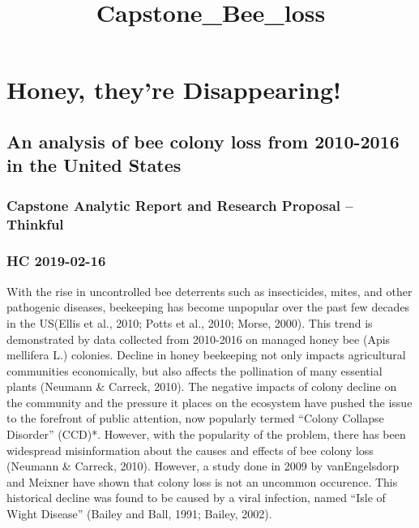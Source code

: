 \documentclass[11pt]{article}
\title{Capstone\_Bee\_loss}
\begin{document}
    
    
    \maketitle
    
    

    
    \hypertarget{honey-theyre-disappearing}{%
\section{Honey, they're Disappearing!}\label{honey-theyre-disappearing}}

\hypertarget{an-analysis-of-bee-colony-loss-from-2010-2016-in-the-united-states}{%
\subsection{An analysis of bee colony loss from 2010-2016 in the United
States}\label{an-analysis-of-bee-colony-loss-from-2010-2016-in-the-united-states}}

\hypertarget{capstone-analytic-report-and-research-proposal-thinkful}{%
\subsubsection{Capstone Analytic Report and Research Proposal --
Thinkful}\label{capstone-analytic-report-and-research-proposal-thinkful}}

\hypertarget{hc-2019-02-16}{%
\subsubsection{HC 2019-02-16}\label{hc-2019-02-16}}

    With the rise in uncontrolled bee deterrents such as insecticides,
mites, and other pathogenic diseases, beekeeping has become unpopular
over the past few decades in the US(Ellis et al., 2010; Potts et al.,
2010; Morse, 2000). This trend is demonstrated by data collected from
2010-2016 on managed honey bee (Apis mellifera L.) colonies. Decline in
honey beekeeping not only impacts agricultural communities economically,
but also affects the pollination of many essential plants (Neumann \&
Carreck, 2010). The negative impacts of colony decline on the community
and the pressure it places on the ecosystem have pushed the issue to the
forefront of public attention, now popularly termed ``Colony Collapse
Disorder'' (CCD)*. However, with the popularity of the problem, there
has been widespread misinformation about the causes and effects of bee
colony loss (Neumann \& Carreck, 2010). However, a study done in 2009 by
vanEngelsdorp and Meixner have shown that colony loss is not an uncommon
occurence. This historical decline was found to be caused by a viral
infection, named ``Isle of Wight Disease'' (Bailey and Ball, 1991;
Bailey, 2002).
\end{document}
